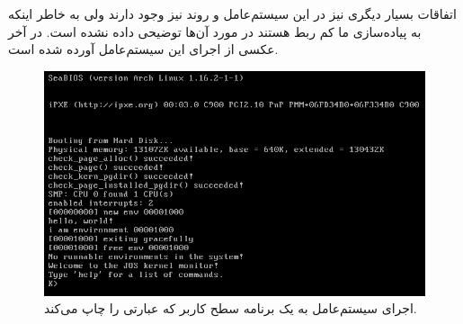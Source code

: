 \documentclass[a4paper, 12pt]{article}
\begin{document}
اتفاقات بسیار دیگری نیز در این سیستم‌عامل و روند نیز وجود دارند ولی به خاطر اینکه به پیاده‌سازی
ما کم ربط هستند در مورد آن‌ها توضیحی داده نشده است.
در آخر عکسی از اجرای این سیستم‌عامل آورده شده است.
\begin{figure}[H]
    \centering
    \includegraphics[width=1.0\textwidth]{hello.png}
    \caption{
        اجرای سیستم‌عامل به یک برنامه سطح کاربر که عبارتی را چاپ می‌کند.
    }
    \label{fig2:output}
\end{figure}
\end{document}
